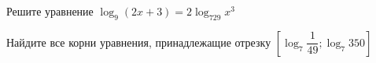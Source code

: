 \begin{ex}
	\begin{condition}
		\begin{enumcols}[label=\asbuk*)]
			\item Решите уравнение \( \log_9 (2x+3) = 2\log_{729} x^3 \)
			\item Найдите все корни уравнения, принадлежащие отрезку \( \left[\log_7 \dfrac{1}{49};\log_7 350\right] \)
		\end{enumcols}
	\end{condition}
\end{ex}